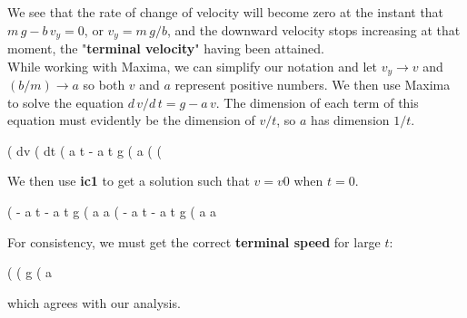 \documentclass[11pt]{article}
\begin{document}
\noindent We see that the rate of change of velocity will become zero at the
  instant that $m \,g - b \,v_{y} = 0$, or $v_{y} = m \,g/b$, and the downward
  velocity stops increasing at that moment, the "\textbf{terminal velocity}" having been
  attained.\\
   
\noindent While working with Maxima, we can simplify our notation and
  let $v_{y} \rightarrow v$ and $(b/m) \rightarrow a$ so both $v$ and $a$ represent
  positive numbers.
We then use Maxima to solve the equation $d\,v/d\,t = g - a\,v$.  
The dimension of each term of this equation must evidently be the dimension of $v/t$,
  so $a$ has dimension $1/t$.
\begin{myVerbatim}
(%
                                 dv
(%
                                 dt
(%
                                           a t
                                - a t  g %
(%
                                          a
(%
(%
\end{myVerbatim}
We then use \textbf{ic1} to get a solution such that $v = v0$ when $t = 0$.
\begin{myVerbatim}
(%
                                             - a t
                              - a t      g %
(%
                                             a       a
(%
                                          - a t
                           - a t      g %
(%
                                          a       a
\end{myVerbatim}
For consistency, we must get the correct \textbf{terminal speed} for large $t$:
\begin{myVerbatim}
(%
(%
                                       g
(%
                                       a
\end{myVerbatim}
which agrees with our analysis.\\
\end{document}
